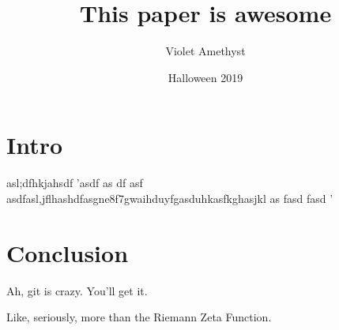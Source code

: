 \documentclass{article}
\title{This paper is awesome}
\date{Halloween 2019}
\author{Violet Amethyst}
\begin{document}
\maketitle


\section{Intro}

asl;dfhkjahsdf
'asdf
as
df
asf
asdfasl,jflhashdfasgne8f7gwaihduyfgasduhkasfkghasjkl
as
fasd
fasd
'

\section{Conclusion}

Ah, git is crazy.  You'll get it.

Like, seriously, more than the Riemann Zeta Function.  
\end{document}
